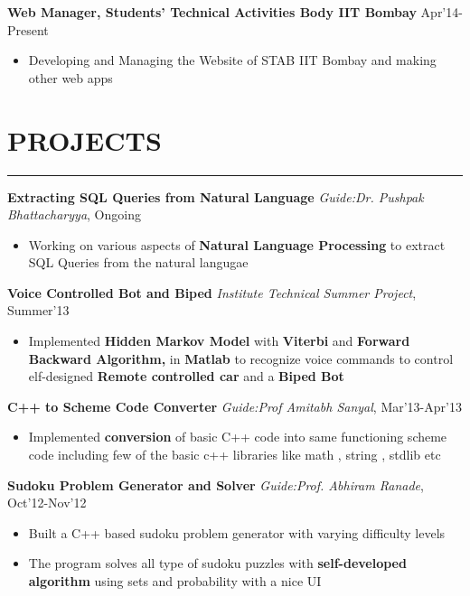 \documentclass[11pt]{article} %
\begin{document}
\noindent \textbf{Web Manager, Students' Technical Activities Body IIT Bombay} \hfill Apr'14-Present
\vspace{-3mm}
\begin{itemize}
\itemsep-0.3em
\item Developing and Managing the Website of STAB IIT Bombay and making other web apps
\end{itemize}
\vspace{-7mm}


\section*{PROJECTS}
\hrule
\medskip

\noindent \textbf{Extracting SQL Queries from Natural Language} \hfill \textit{Guide:Dr. Pushpak Bhattacharyya}, Ongoing
\vspace{-3mm}
\begin{itemize}
\itemsep-0.3em
\item Working on various aspects of \textbf{Natural Language Processing} to extract SQL Queries from the natural langugae
\end{itemize}
\vspace{-2mm}


\noindent \textbf{Voice Controlled Bot and Biped} \hfill \textit{Institute Technical Summer Project}, Summer'13
\vspace{-3mm}
\begin{itemize}
\itemsep-0.3em
\item Implemented \textbf{Hidden Markov Model} with \textbf{Viterbi} and {\bf Forward Backward Algorithm,} in \textbf{Matlab} to recognize voice commands to control elf-designed \textbf{Remote controlled car} and a \textbf{Biped Bot}

\end{itemize}
\vspace{-2mm}

\noindent \textbf{C++ to Scheme Code Converter} \hfill \textit{Guide:Prof Amitabh Sanyal}, Mar'13-Apr'13
\vspace{-3mm}
\begin{itemize}
\itemsep-0.3em
\item Implemented \textbf{conversion} of basic C++ code into same functioning scheme code including few of the basic c++ libraries like math , string , stdlib etc
\end{itemize}
\vspace{-2mm}

\noindent \textbf{Sudoku Problem Generator and Solver} \hfill 
\textit{Guide:Prof. Abhiram Ranade}, Oct'12-Nov'12
\vspace{-3mm}
\begin{itemize}
\itemsep-0.3em
\item Built a C++ based sudoku problem generator with varying difficulty levels
\item The program solves all type of sudoku puzzles with \textbf{self-developed algorithm} using sets and probability with a nice UI
\end{itemize}
\vspace{-2mm}
\end{document}
